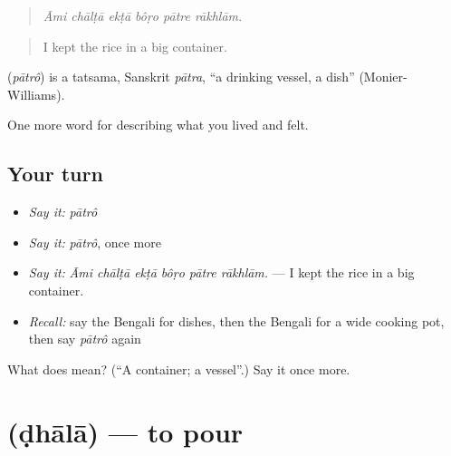 \begin{quote}
     
\end{quote}

\begin{quote}
\emph{Āmi chālṭā ekṭā bôṛo pātre rākhlām.}
\end{quote}

\begin{quote}
I kept the rice in a big container.
\end{quote}

\begin{cousinweb}
\textbf{} (\emph{pātrô}) is a tatsama, Sanskrit \emph{pātra}, \textquotedblleft{}a drinking vessel, a dish\textquotedblright{} (Monier-Williams).
\end{cousinweb}

\begin{grammarlens}[title={What you've built}]
One more word for describing what you lived and felt.
\end{grammarlens}

\subsection*{Your turn}
\begin{itemize}
\raggedright
  \item \emph{Say it:} \emph{pātrô}
  \item \emph{Say it:} \emph{pātrô}, once more
  \item \emph{Say it:} \emph{Āmi chālṭā ekṭā bôṛo pātre rākhlām.} — I kept the rice in a big container.
  \item \emph{Recall:} say the Bengali for dishes, then the Bengali for a wide cooking pot, then say \emph{pātrô} again
\end{itemize}

\begin{tcolorbox}[breakable,colback=teal!4,colframe=teal!35!black,title={Before you move on}]
What does  mean? (\textquotedblleft{}A container; a vessel\textquotedblright{}.) Say it once more.
\end{tcolorbox}
\section[\texorpdfstring{\bn{ঢালা} (ḍhālā)}{ঢালা (ḍhālā)}]{ (ḍhālā) — to pour}

\label{lesson:BN-C511-dhala}



